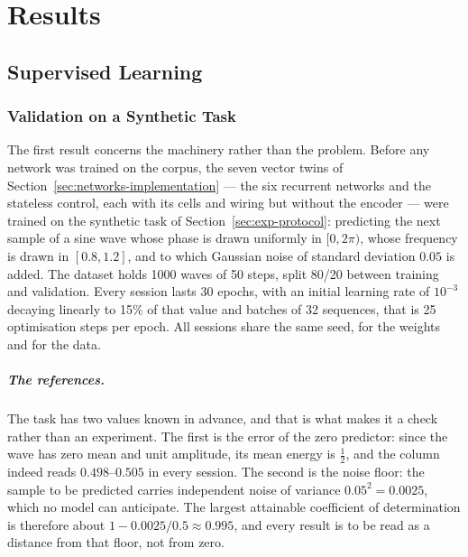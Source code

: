 \chapter{Results}
\label{ch:results}

\section{Supervised Learning}
\label{sec:res-sl}

\subsection{Validation on a Synthetic Task}
\label{sec:res-sl-synthetic}

The first result concerns the machinery rather than the problem. Before any
network was trained on the corpus, the seven vector twins of
Section~\ref{sec:networks-implementation} --- the six recurrent networks and the
stateless control, each with its cells and wiring but without the encoder ---
were trained on the synthetic task of Section~\ref{sec:exp-protocol}: predicting
the next sample of a sine wave whose phase is drawn uniformly in $[0, 2\pi)$,
whose frequency is drawn in $[0.8, 1.2]$, and to which Gaussian noise of
standard deviation $0.05$ is added. The dataset holds \num{1000} waves of
\num{50} steps, split 80/20 between training and validation. Every session lasts
\num{30} epochs, with an initial learning rate of $10^{-3}$ decaying linearly to
15\% of that value and batches of \num{32} sequences, that is \num{25}
optimisation steps per epoch. All sessions share the same seed, for the weights
and for the data.

\paragraph{The references.}
The task has two values known in advance, and that is what makes it a check
rather than an experiment. The first is the error of the zero predictor: since
the wave has zero mean and unit amplitude, its mean energy is $\tfrac12$, and
the  column indeed reads $0.498$--$0.505$ in every
session. The second is the noise floor: the sample to be predicted carries
independent noise of variance $0.05^2 = 0.0025$, which no model can anticipate.
The largest attainable coefficient of determination is therefore about
$1 - 0.0025/0.5 \approx 0.995$, and every result is to be read as a distance
from that floor, not from zero.

